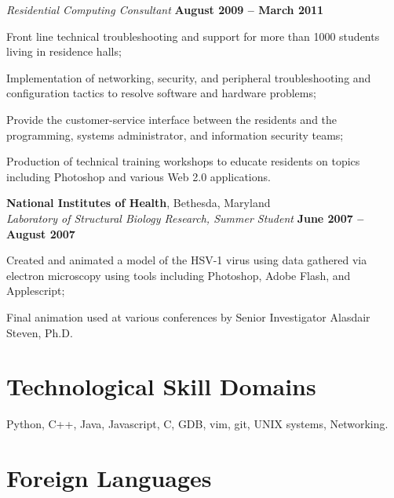\documentclass[margin,line]{resume}
\begin{document}
\begin{resume}
	\textsl{Residential Computing Consultant} \hfill \textbf{August 2009 -- March 2011}
	\begin{list2}
		\item Front line technical troubleshooting and support for more than 1000 students living in residence halls;
		\item Implementation of networking, security, and peripheral troubleshooting and configuration tactics to resolve software and hardware problems;
		\item Provide the customer-service interface between the residents and the programming, systems administrator, and information security teams;
		\item Production of technical training workshops to educate residents on topics including Photoshop and various Web 2.0 
	applications. 
	\end{list2}\vspace{-1.5mm}

	\textbf{National Institutes of Health}, Bethesda, Maryland \vspace{1mm}\\\vspace{0mm}%
	\textsl{Laboratory of Structural Biology Research, Summer Student} \hfill \textbf{June 2007 -- August 2007}
	\begin{list2}
		\item Created and animated a model of the HSV-1 virus using data gathered via electron microscopy 
	using tools including Photoshop, Adobe Flash, and Applescript;
		\item Final animation used at various conferences by Senior Investigator Alasdair Steven, Ph.D.
	\end{list2}\vspace{-1.5mm}

	\section{\mysidestyle Technological Skill Domains} 

	Python, C++, Java, Javascript, C, GDB, vim, git, UNIX systems, Networking.


	\section{\mysidestyle Foreign Languages}


\end{resume}
\end{document}
